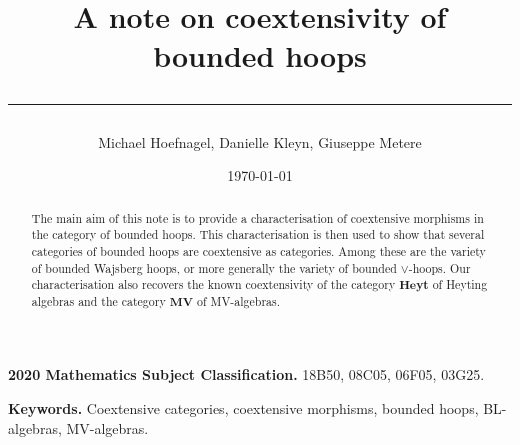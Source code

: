 \documentclass[11pt]{article}
\title{
  \vspace{-2em}
  {\Huge\bfseries A note on coextensivity of bounded hoops}\\[1em]
  \rule{0.75\textwidth}{0.6pt}
}
\author{Michael Hoefnagel,  Danielle Kleyn, Giuseppe Metere}
\date{\today}
\theoremstyle{pretty}
\theoremstyle{plainnote}
\renewcommand{\2}{\mathbf{2}}
\begin{document}
\maketitle

\begin{abstract}
The main aim of this note is to provide a characterisation of coextensive morphisms in the category of bounded hoops. This characterisation is then used to show that several categories of bounded hoops are coextensive as categories. Among these are the variety of bounded Wajsberg hoops, or more generally the variety of bounded $\vee$-hoops. Our characterisation also recovers the known coextensivity of the category $\mathbf{Heyt}$ of Heyting algebras and the category $\mathbf{MV}$ of MV-algebras.
\end{abstract}

\noindent\textbf{2020 Mathematics Subject Classification.}
18B50, 08C05, 06F05, 03G25.

\noindent\textbf{Keywords.}
Coextensive categories, coextensive morphisms,  bounded hoops, BL-algebras, MV-algebras.
\end{document}

